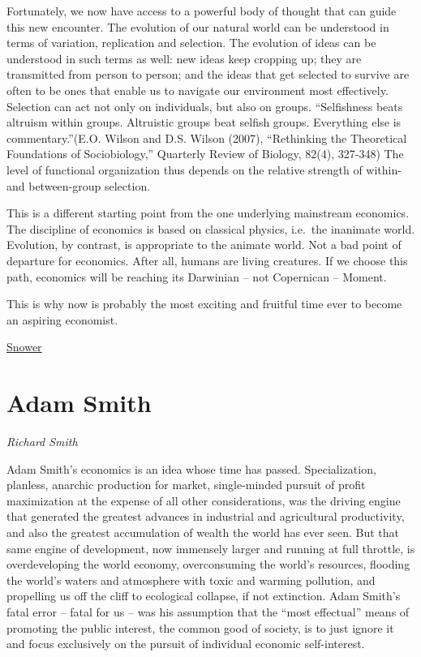 \documentclass[
]{book}
\begin{document}
Fortunately, we now have access to a powerful body of thought that can guide this new encounter. The evolution of our natural world can be understood in terms of variation, replication and selection. The evolution of ideas can be understood in such terms as well: new ideas keep cropping up; they are transmitted from person to person; and the ideas that get selected to survive are often to be ones that enable us to navigate our environment most effectively. Selection can act not only on individuals, but also on groups. ``Selfishness beats altruism within groups. Altruistic groups beat selfish groups. Everything else is commentary.''(E.O. Wilson and D.S. Wilson (2007), ``Rethinking the Theoretical Foundations of Sociobiology,'' Quarterly Review of Biology, 82(4), 327-348) The level of functional organization thus depends on the relative strength of within- and between-group selection.

This is a different starting point from the one underlying mainstream economics. The discipline of economics is based on classical physics, i.e.~the inanimate world. Evolution, by contrast, is appropriate to the animate world. Not a bad point of departure for economics. After all, humans are living creatures. If we choose this path, economics will be reaching its Darwinian -- not Copernican -- Moment.

This is why now is probably the most exciting and fruitful time ever to become an aspiring economist.

\href{https://evonomics.com/why-behavioral-economics-cant-fix-a-broken-discipline/}{Snower}

\hypertarget{adam-smith}{%
\section{Adam Smith}\label{adam-smith}}

\emph{Richard Smith}

Adam Smith's economics is an idea whose time has passed. Specialization, planless,
anarchic production for market, single-minded pursuit of profit maximization at the
expense of all other considerations, was the driving engine that generated the
greatest advances in industrial and agricultural productivity, and also the greatest
accumulation of wealth the world has ever seen. But that same engine of
development, now immensely larger and running at full throttle, is overdeveloping
the world economy, overconsuming the world's resources, flooding the world's
waters and atmosphere with toxic and warming pollution, and propelling us off the
cliff to ecological collapse, if not extinction. Adam Smith's fatal error -- fatal for us
-- was his assumption that the ``most effectual'' means of promoting the public
interest, the common good of society, is to just ignore it and focus exclusively on the
pursuit of individual economic self-interest.
\end{document}

